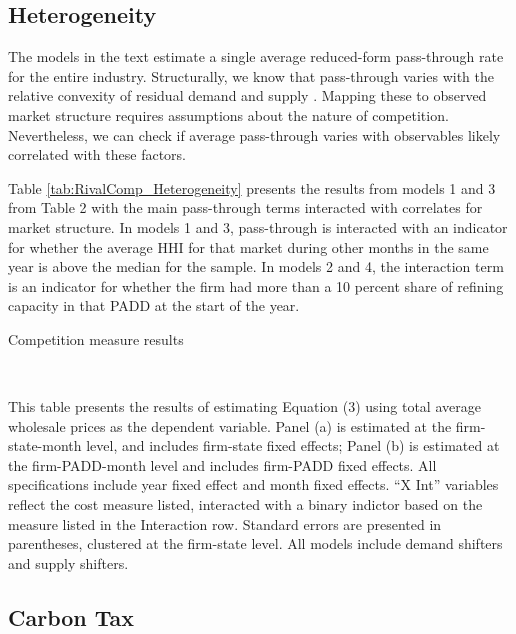 \documentclass[12pt]{article}
\newcommand{\tablepath}{../output/offline/tables}
\renewcommand{\footnotesize}{\normalsize}
\begin{document}
\subsection{Heterogeneity}

The models in the text estimate a single average reduced-form pass-through rate for the entire industry. Structurally, we know that pass-through varies with the relative convexity of residual demand and supply \citep{weyl_pass-through_2013}. Mapping these to observed market structure requires assumptions about the nature of competition. Nevertheless, we can check if average pass-through varies with observables likely correlated with these factors.

Table \ref{tab:RivalComp_Heterogeneity} presents the results from models 1 and 3 from Table 2 with the main pass-through terms interacted with correlates for market structure. In models 1 and 3, pass-through is interacted with an indicator for whether the average HHI for that market during other months in the same year is above the median for the sample. In models 2 and 4, the interaction term is an indicator for whether the firm had more than a 10 percent share of refining capacity in that PADD at the start of the year.

\begin{sidewaystable}[h!]
  \centering
    \caption{Competition measure results \label{tab:RivalComp_Heterogeneity}}
  \footnotesize
     \\
    \smallskip{}
  \begin{minipage}{.9\linewidth}
  \scriptsize
   This table presents the results of estimating Equation (3) using total average wholesale prices as the dependent variable. Panel (a) is estimated at the firm-state-month level, and includes firm-state fixed effects; Panel (b) is estimated at the firm-PADD-month level and includes firm-PADD fixed effects. All specifications include year fixed effect and month fixed effects. ``X Int'' variables reflect the cost measure listed, interacted with a binary indictor based on the measure listed in the Interaction row. Standard errors are presented in parentheses, clustered at the firm-state level. All models include demand shifters and supply shifters.
  \end{minipage}
\end{sidewaystable}
\clearpage
\subsection{Carbon Tax}
\end{document}
